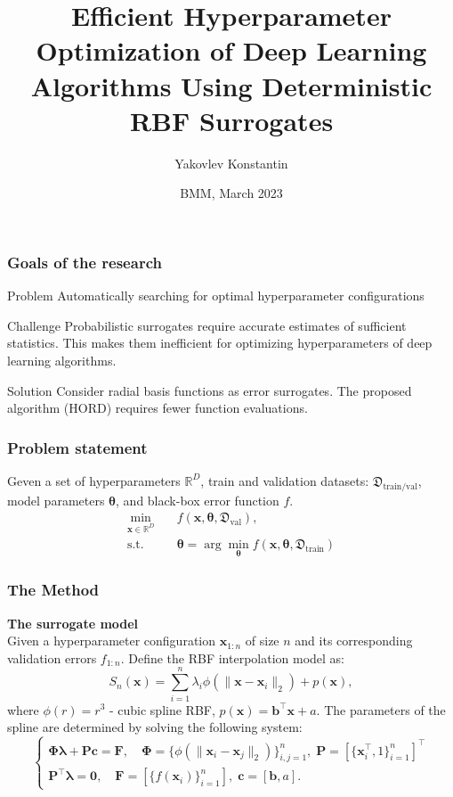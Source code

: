 \documentclass{beamer}
\title[]
{Efficient Hyperparameter Optimization of Deep Learning
Algorithms Using Deterministic RBF Surrogates}
\author[Yakovlev Konstantin]
{Yakovlev Konstantin}
\date[2023] %
{BMM, March 2023}
\begin{document}
\frame{\titlepage}


\begin{frame}
\frametitle{Goals of the research}

\begin{block}{Problem}
  Automatically searching for optimal hyperparameter configurations
\end{block}

\begin{block}{Challenge}
  Probabilistic surrogates require accurate estimates of sufficient statistics.
  This makes them inefficient for optimizing hyperparameters of deep learning algorithms.
\end{block}

\begin{block}{Solution}
  Consider radial basis functions as error surrogates. The proposed algorithm
  (HORD) requires fewer function evaluations.
\end{block}

\end{frame}


\begin{frame}
  \frametitle{Problem statement}
  Geven a set of hyperparameters $\mathbb{R}^D$, train and validation datasets:
  $\mathfrak{D}_\text{train/val}$, model parameters $\boldsymbol{\theta}$, and
  black-box error function $f$.
  \begin{align*}
    \min_{\mathbf{x}\in \mathbb{R}^D}\quad &f(\mathbf{x}, \boldsymbol{\theta}, \mathfrak{D}_\text{val}), \\
    \mathrm{s.t.} \quad &\boldsymbol{\theta} = \arg\min_{\boldsymbol{\theta}}f(\mathbf{x}, \boldsymbol{\theta}, \mathfrak{D}_\text{train})
  \end{align*}
  
\end{frame}


\begin{frame}
  \frametitle{The Method}
  \textbf{The surrogate model}\\
  Given a hyperparameter configuration $\mathbf{x}_{1:n}$ of size $n$ and its corresponding
  validation errors $f_{1:n}$. Define the RBF interpolation model as:
  \[
    S_n(\mathbf{x}) = \sum_{i=1}^n\lambda_i\phi(\|\mathbf{x} - \mathbf{x}_i\|_2) + 
    p(\mathbf{x}),
  \]
  where $\phi(r) = r^3$ - cubic spline RBF, $p(\mathbf{x}) = \mathbf{b}^\top\mathbf{x} + a$.
  The parameters of the spline are determined by solving the following system:
  \[
  \begin{cases}
    \mathbf{\Phi}\boldsymbol{\lambda} + \mathbf{P}\mathbf{c} = \mathbf{F}, \quad
    \mathbf{\Phi} = \{\phi(\|\mathbf{x}_i - \mathbf{x}_j\|_2)\}_{i, j=1}^n,\;
    \mathbf{P} = [\{\mathbf{x}_i^\top, 1\}_{i=1}^n]^\top \\
    \mathbf{P}^\top\boldsymbol{\lambda} = \mathbf{0}, \quad \mathbf{F} = [\{f(\mathbf{x}_i)\}_{i=1}^n],\;
    \mathbf{c} = [\mathbf{b}, a].
  \end{cases}
  \]

\end{frame}
\end{document}
